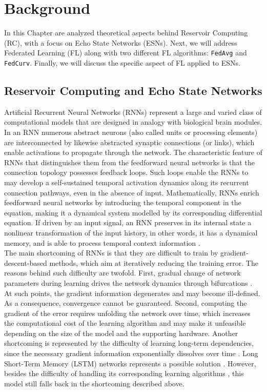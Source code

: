 \chapter{Background}\label{chapter:background}

In this Chapter are analyzed theoretical aspects behind Reservoir Computing (RC), with a focus on Echo State Networks (ESNs). Next, we will address Federated Learning (FL) along with two different FL algorithms: \texttt{FedAvg} and \texttt{FedCurv}. Finally, we will discuss the specific aspect of FL applied to ESNs.

\section{Reservoir Computing and Echo State Networks}

Artificial Recurrent Neural Networks (RNNs) represent a large and varied class of computational models that are designed in analogy with biological brain modules. In an RNN numerous abstract neurons (also called units or processing elements) are interconnected by likewise abstracted synaptic connections (or links), which enable activations to propagate through the network. The characteristic feature of RNNs that distinguishes them from the feedforward neural networks is that the connection topology possesses feedback loops. Such loops enable the RNNs to may develop a self-sustained temporal activation dynamics along its recurrent connection pathways, even in the absence of input. Mathematically, RNNs enrich feedforward neural networks by introducing the temporal component in the equation, making it a dynamical system modelled by its corresponding differential equation. If driven by an input signal, an RNN preserves in its internal state a nonlinear transformation of the input history, in other words, it has a dynamical memory, and is able to process temporal context information \cite{lukovsevivcius2009reservoir}. \\

The main shortcoming of RNNs is that they are difficult to train by gradient-descent-based methods, which aim at iteratively reducing the training error. The reasons behind such difficulty are twofold. First, gradual change of network parameters during learning drives the network dynamics through bifurcations \cite{doya1992bifurcations}. At such points, the gradient information degenerates and may become ill-defined. As a consequence, convergence cannot be guaranteed. Second, computing the gradient of the error requires unfolding the network over time, which increases the computational cost of the learning algorithm and may make it unfeasible depending on the size of the model and the supporting hardware. Another shortcoming is represented by the difficulty of learning long-term dependencies, since the necessary gradient information exponentially dissolves over time \cite{bengio1994learning}. Long Short-Term Memory (LSTM) networks represents a possible solution \cite{gers2000learning}. However, besides the difficulty of handling its corresponding learning algorithms \cite{lukovsevivcius2009reservoir}, this model still falls back in the shortcoming described above. \\

